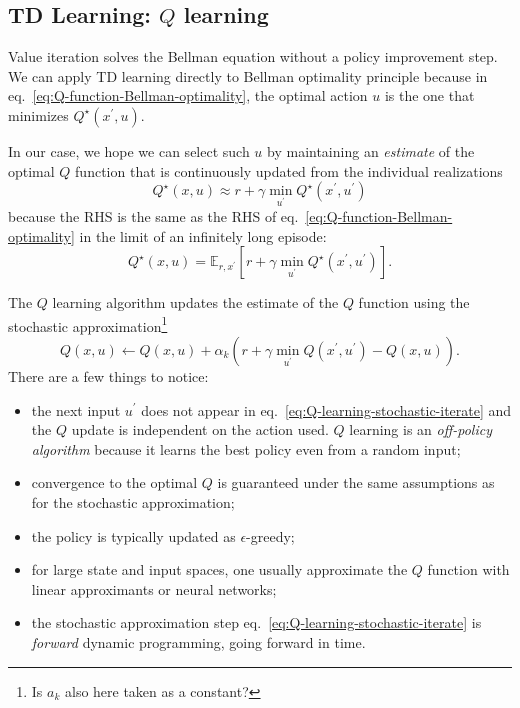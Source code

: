 \subsection{TD Learning: $Q$ learning}
\label{sec:TD-learning-Q-learning}

Value iteration solves the Bellman equation without a policy improvement step. We can apply TD learning directly to Bellman optimality principle because in eq.~\eqref{eq:Q-function-Bellman-optimality}, the optimal action $u$ is the one that minimizes $Q^\star(x^\prime,u)$.

In our case, we hope we can select such $u$ by maintaining an \emph{estimate} of the optimal $Q$ function that is continuously updated from the individual realizations
\begin{equation*}
  Q^\star(x,u) \approx r + \gamma \min_{u^\prime} Q^\star(x^\prime,u^\prime)
\end{equation*}
because the RHS is the same as the RHS of eq.~\eqref{eq:Q-function-Bellman-optimality} in the limit of an infinitely long episode:
\begin{equation*}
  Q^\star(x,u) = \mathbb{E}_{r,x^\prime} \left[r + \gamma \min_{u^\prime} Q^\star(x^\prime,u^\prime)\right].
\end{equation*}

The $Q$ learning algorithm updates the estimate of the $Q$ function using the stochastic approximation\footnote{Is $a_k$ also here taken as a constant?}
\begin{equation}
  \label{eq:Q-learning-stochastic-iterate}
  Q(x,u) \leftarrow Q(x,u) + \alpha_k\left(r + \gamma \min_{u^\prime} Q(x^\prime,u^\prime) - Q(x,u)\right).
\end{equation}
There are a few things to notice:
\begin{itemize}
\item the next input $u^\prime$ does not appear in eq.~\eqref{eq:Q-learning-stochastic-iterate} and the $Q$ update is independent on the action used. $Q$ learning is an \emph{off-policy algorithm} because it learns the best policy even from a random input;
\item convergence to the optimal $Q$ is guaranteed under the same assumptions as for the stochastic approximation;
\item the policy is typically updated as $\epsilon$-greedy;
\item for large state and input spaces, one usually approximate the $Q$ function with linear approximants or neural networks;
\item the stochastic approximation step eq.~\eqref{eq:Q-learning-stochastic-iterate} is \emph{forward} dynamic programming, going forward in time.
\end{itemize}

